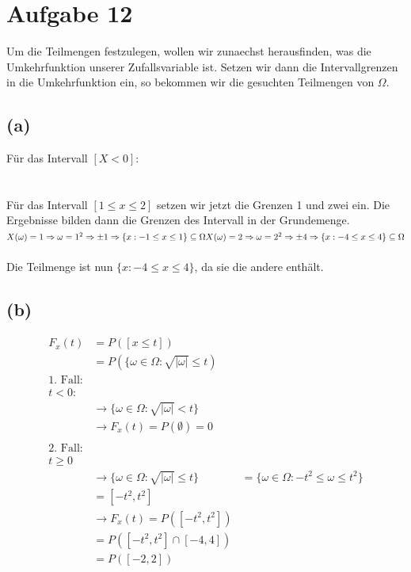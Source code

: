 \documentclass[a4paper]{scrartcl}
\begin{document}
\section*{Aufgabe 12}
Um die Teilmengen festzulegen, wollen wir zunaechst herausfinden, was die Umkehrfunktion unserer Zufallsvariable ist. Setzen wir dann die Intervallgrenzen in die Umkehrfunktion ein, so bekommen wir die gesuchten Teilmengen von $\Omega$.
\subsection*{(a)}
Für das Intervall $\left[X < 0 \right]$:\\
\\
\\
Für das Intervall $\left[ 1 \leq x \leq 2 \right]$ setzen wir jetzt die Grenzen 1 und zwei ein. Die Ergebnisse bilden dann die Grenzen des Intervall in der Grundemenge.\\
$
X(\omega) = 1 \Rightarrow \omega = 1^2 \Rightarrow \pm 1 \Rightarrow \lbrace x:-1 \leq x \leq 1 \rbrace \subseteq \Omega\\
X(\omega) = 2 \Rightarrow \omega = 2^2 \Rightarrow \pm 4 \Rightarrow \lbrace x: -4 \leq x \leq 4 \rbrace \subseteq \Omega
$\\
\\
Die Teilmenge ist nun $\lbrace x: -4 \leq x \leq 4 \rbrace $, da sie die andere enthält.

\subsection*{(b)}
\begin{align*}
	F_x(t) &= P(\left[x \leq t \right])\\
	&=P(\lbrace \omega \in \Omega: \sqrt{|\omega|} \leq t)\\
	\text{1. Fall:}&\\
	t < 0:&\\
	&\rightarrow \lbrace \omega \in \Omega: \sqrt{|\omega|} < t\rbrace\\
	&\rightarrow F_x(t) = P(\emptyset) = 0\\
	\\
	\text{2. Fall:}&\\
	t \geq 0&\\
	&\rightarrow \lbrace \omega \in \Omega: \sqrt{|\omega|} \leq t\rbrace &= \lbrace \omega \in \Omega: -t^2 \leq \omega \leq t^2\rbrace\\
	&= \left[-t^2, t^2 \right]\\
	&\rightarrow F_x(t) = P(\left[-t^2, t^2 \right])\\
	&=P(\left[-t^2, t^2\right] \cap \left[ -4, 4 \right])\\
	& = P(\left[-2, 2 \right])
\end{align*}
\end{document}

